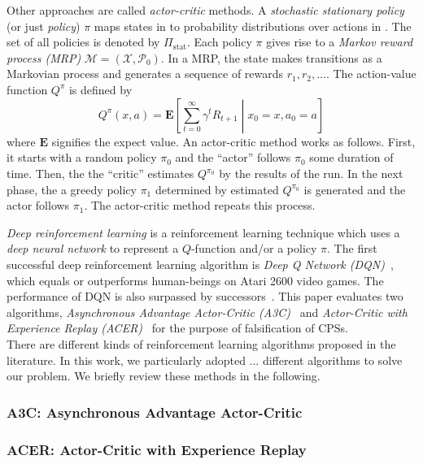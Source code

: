 Other approaches are called \emph{actor-critic} methods.
A \emph{stochastic stationary policy} (or just \emph{policy}) $\pi$ maps states in \state to probability distributions over actions in \action.
The set of all policies is denoted by $\Pi_{\mathrm{stat}}$.
Each policy $\pi$ gives rise to a \emph{Markov reward process (MRP)} $\mathcal M = (\mathcal X, \mathcal P_0)$.
In a MRP, the state makes transitions as a Markovian process and generates a sequence of rewards $r_1, r_2, \ldots$.
The action-value function $Q^\pi$ is defined by
\begin{equation}
  Q^\pi(x, a) = \mathbf E \left[ \sum_{t = 0}^\infty \gamma^t R_{t+1} \middle| x_0 = x, a_0 = a \right]
\end{equation}
where $\mathbf E$ signifies the expect value.
An actor-critic method works as follows.
First, it starts with a random policy $\pi_0$ and the ``actor'' follows $\pi_0$ some duration of time.
Then, the the ``critic'' estimates $Q^{\pi_0}$ by the results of the run.
In the next phase, the a greedy policy $\pi_1$ determined by estimated $Q^{\pi_0}$ is generated and the actor follows $\pi_1$.
The actor-critic method repeats this process.

\emph{Deep reinforcement learning} is a reinforcement learning technique which uses a \emph{deep neural network} to represent a $Q$-function and/or a policy $\pi$.
The first successful deep reinforcement learning algorithm is \emph{Deep Q Network (DQN)}~\cite{mnih2015human}, which equals or outperforms human-beings on Atari 2600 video games.
The performance of DQN is also surpassed by successors~\cite{Mnih2016,Wang2016}.
This paper evaluates two algorithms, \emph{Asynchronous Advantage Actor-Critic (A3C)}~\cite{Mnih2016} and \emph{Actor-Critic with Experience Replay (ACER)}~\cite{Wang2016} for the purpose of falsification of CPSs.
\\

There are different kinds of reinforcement learning algorithms proposed in the literature. 
In this work, we particularly adopted ... different algorithms to solve our problem. 
We briefly review these methods in the following.
%
\subsubsection{A3C: Asynchronous Advantage Actor-Critic}

\subsubsection{ACER: Actor-Critic with Experience Replay}
